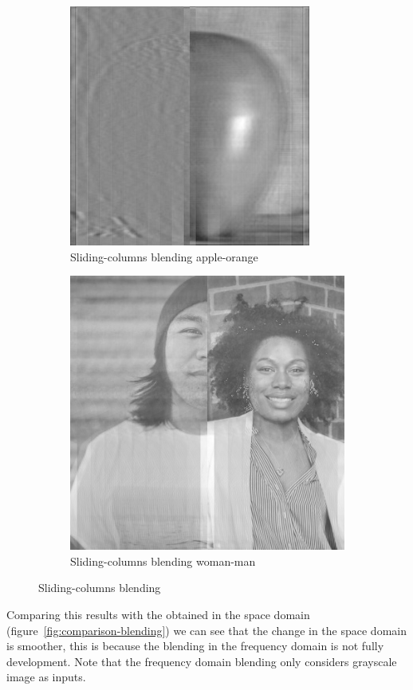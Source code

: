 \begin{itemize}
\begin{figure}[h!]
\centering
\begin{subfigure}{0.4\textwidth}
  \centering
  \includegraphics[width=0.7\linewidth]{output/sliding_columns1.jpg}
  \caption{Sliding-columns blending apple-orange}
\end{subfigure}%
\begin{subfigure}{0.4\textwidth}
  \centering
  \includegraphics[width=0.7\linewidth]{output/sliding_columns2.jpg}
  \caption{Sliding-columns blending woman-man}
\end{subfigure}%
\caption{Sliding-columns blending}
\label{fig:sliding-columns}
\end{figure}

\end{itemize}

Comparing this results with the obtained in the space domain (figure~\ref{fig:comparison-blending}) we can see that the change in the space domain is smoother, this is because the blending in the frequency domain is not fully development. Note that the frequency domain blending only considers grayscale image as inputs.

